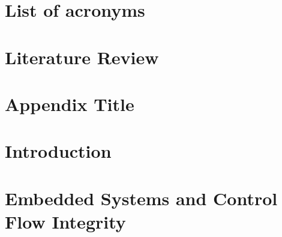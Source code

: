 \documentclass[10pt]{report}
\newif\iflitreview
\newif\ifnotesincluded
\begin{document}


\iflitreview

\else

\fi
\ifnotesincluded
\chapter*{Abstract}
This is my abstract

\chapter*{Dedication}
This is my dedication

\chapter*{Declaration}
This is my declaration

\chapter*{Acknowledgements}
Thanks everyone!

\fi

\tableofcontents
\lstlistoflistings
\listoffigures
\listoftables

\chapter*{List of acronyms}


\iflitreview

\chapter{Literature Review}


\appendix
\chapter{Appendix Title}

\else

\chapter{Introduction}







\chapter{Embedded Systems and Control Flow Integrity} \label{chapterCFI}


\end{document}
